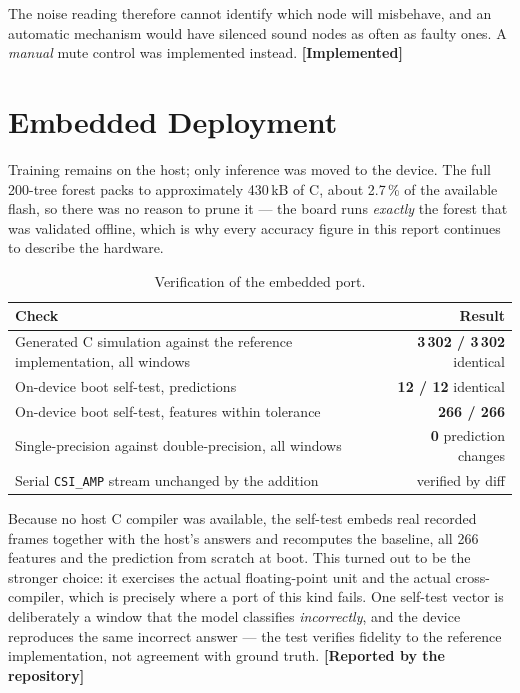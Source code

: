 \documentclass[11pt,a4paper,oneside]{report}
\newcommand{\evidencetag}[2]{{\small\sffamily\bfseries\textcolor{#1}{[#2]}}}
\newcommand{\Impl}{\evidencetag{good}{Implemented}}
\newcommand{\Repo}{\evidencetag{neutralgrey}{Reported by the repository}}
\newcommand{\code}[1]{\texttt{\small #1}}
\begin{document}
\noindent
The noise reading therefore cannot identify which node will misbehave, and an
automatic mechanism would have silenced sound nodes as often as faulty ones. A
\emph{manual} mute control was implemented instead. \Impl

\section{Embedded Deployment}

Training remains on the host; only inference was moved to the device. The full
200-tree forest packs to approximately 430\,kB of C, about 2.7\,\% of the
available flash, so there was no reason to prune it --- the board runs
\emph{exactly} the forest that was validated offline, which is why every
accuracy figure in this report continues to describe the hardware.

\begin{table}[H]
\centering
\caption{Verification of the embedded port.}
\label{tab:embedded}
\begin{tabularx}{\linewidth}{@{}Xr@{}}
\toprule
\textbf{Check} & \textbf{Result} \\
\midrule
Generated C simulation against the reference implementation, all windows &
\textbf{3\,302 / 3\,302} identical \\
On-device boot self-test, predictions & \textbf{12 / 12} identical \\
On-device boot self-test, features within tolerance & \textbf{266 / 266} \\
Single-precision against double-precision, all windows &
\textbf{0} prediction changes \\
Serial \code{CSI\_AMP} stream unchanged by the addition & verified by diff \\
\bottomrule
\end{tabularx}
\end{table}

\noindent
Because no host C compiler was available, the self-test embeds real recorded
frames together with the host's answers and recomputes the baseline, all 266
features and the prediction from scratch at boot. This turned out to be the
stronger choice: it exercises the actual floating-point unit and the actual
cross-compiler, which is precisely where a port of this kind fails. One
self-test vector is deliberately a window that the model classifies
\emph{incorrectly}, and the device reproduces the same incorrect answer --- the
test verifies fidelity to the reference implementation, not agreement with
ground truth. \Repo
\end{document}
